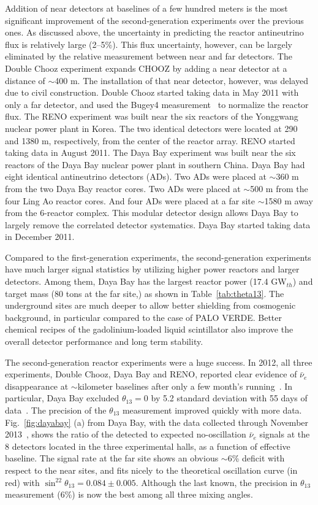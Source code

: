 \documentclass[aps,twocolumn,preprintnumbers,amsmath,superscriptaddress,amssymb,floats,nofootinbib]{revtex4-1}
\begin{document}
Addition of near detectors at baselines of a few hundred meters is the most significant improvement of the second-generation experiments over the previous ones.
As discussed above, the uncertainty in predicting the reactor antineutrino flux is relatively large (2--5\%). 
This flux uncertainty, however, can be largely eliminated by the relative measurement between near and far detectors. 
The Double Chooz experiment expands CHOOZ by adding a near detector at a distance of $\sim$400 m. 
The installation of that near detector, however, was delayed due to civil construction. 
Double Chooz started taking data in May 2011 with only a far detector, and used the Bugey4 measurement~\cite{Bugey4} to normalize the reactor flux. 
The RENO experiment was built near the six reactors of the Yonggwang nuclear power plant in Korea. 
The two identical detectors were located at 290 and 1380 m, respectively, from the center of the reactor array. 
RENO started taking data in August 2011. 
The Daya Bay experiment was built near the six reactors of the Daya Bay nuclear power plant in southern China. 
Daya Bay had eight identical antineutrino detectors (ADs). 
Two ADs were placed at $\sim$360 m from the two  Daya Bay reactor cores. 
Two ADs were placed at $\sim$500 m from the four Ling Ao reactor cores. 
And four ADs were placed at a far site $\sim$1580 m away from the 6-reactor complex. 
This modular detector design allows Daya Bay to largely remove the correlated detector systematics. 
Daya Bay started taking data in December 2011.

Compared to the first-generation experiments, the second-generation experiments have much larger signal statistics by utilizing higher power reactors and larger detectors. Among them, Daya Bay has the largest reactor power (17.4 GW$_{th}$) and target mass (80 tons at the far site,) as shown in Table~\ref{tab:theta13}. 
The underground sites are much deeper to allow better shielding from cosmogenic background, in particular compared to the case of PALO VERDE. 
Better chemical recipes of the gadolinium-loaded liquid scintillator also improve the overall detector performance and long term stability.

The second-generation reactor experiments were a huge success. 
In 2012, all three experiments, Double Chooz, Daya Bay and RENO, reported 
clear evidence of $\bar\nu_{e}$ disappearance at $\sim$kilometer baselines after only a few month's running~\cite{DChooz,Reno,Dayabay}. 
In particular, Daya Bay excluded $\theta_{13}=0$ by 5.2 standard deviation with 55 days of data~\cite{Dayabay}. 
The precision of the $\theta_{13}$ measurement improved quickly with more data.
Fig.~\ref{fig:dayabay} (a) from Daya Bay, with the data collected through November 2013~\cite{Zhang-Neutrino14}, shows the ratio of the detected to expected no-oscillation $\bar\nu_{e}$ signals at the 8 detectors located in the three experimental halls, as a function of effective baseline.
The signal rate at the far site shows an obvious
$\sim$6\% deficit with respect to the near sites, and fits nicely to the theoretical oscillation curve (in red) with $\sin^22\theta_{13} = 0.084 \pm 0.005$. 
Although the last known, the precision in $\theta_{13}$ measurement (6\%) is now the best among all three mixing angles.
\end{document}
